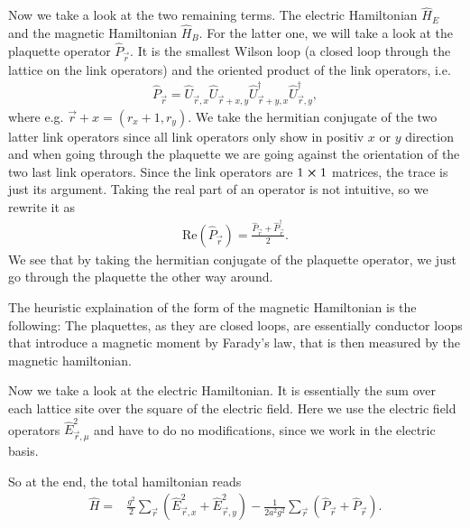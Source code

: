 Now we take a look at the two remaining terms. The electric Hamiltonian $\hat{H}_E$ and the magnetic Hamiltonian $\hat{H}_B$. For the latter one, we will take a look at the plaquette operator $\hat{P}_{\vec{r}}$. It is the smallest Wilson loop (a closed loop through the lattice on the link operators) and the oriented product of the link operators, i.e.
\begin{align}
	\hat{P}_{\vec{r}}=\hat{U}_{\vec{r}, x}\hat{U}_{\vec{r}+x,y}\hat{U}^{\dag}_{\vec{r}+y,x}\hat{U}^{\dag}_{\vec{r},y},
\end{align}
where e.g. $\vec{r}+x=(r_x+1,r_y)$. We take the hermitian conjugate of the two latter link operators since all link operators only show in positiv $x$ or $y$ direction and when going through the plaquette we are going against the orientation of the two last link operators. Since the link operators are $1\cross1$ matrices, the trace is just its argument. Taking the real part of an operator is not intuitive, so we rewrite it as 
\begin{align}
  \text{Re}(\hat{P}_{\vec{r}})=\frac{\hat{P}_{\vec{r}}+\hat{P}_{\vec{r}}^{\dag}}{2}.
\end{align}
We see that by taking the hermitian conjugate of the plaquette operator, we just go through the plaquette the other way around.

The heuristic explaination of the form of the magnetic Hamiltonian is the following: The plaquettes, as they are closed loops, are essentially conductor loops that introduce a magnetic moment by Farady's law, that is then measured by the magnetic hamiltonian. %

Now we take a look at the electric Hamiltonian. It is essentially the sum over each lattice site over the square of the electric field. Here we use the electric field operators $\hat{E}^{2}_{\vec{r},\mu}$ and have to do no modifications, since we work in the electric basis.

So at the end, the total hamiltonian reads
\begin{align*}
  \hat{H} = & \frac{g^2}{2}\sum_{\vec{r}}\left(\hat{E}_{\vec{r}, x}^2+\hat{E}_{\vec{r}, y}^2\right)-\frac{1}{2a^2g^2}\sum_{\vec{r}}\left(\hat{P}_{\vec{r}}+\hat{P}_{\vec{r}}\right).
\end{align*}
  
